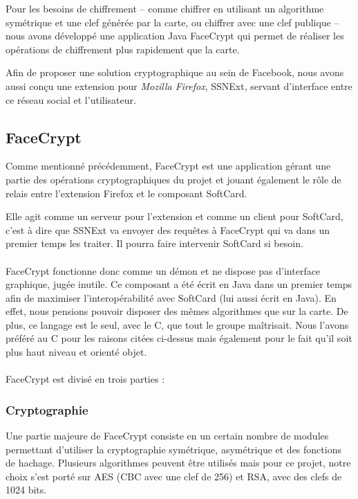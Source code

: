 \documentclass[a4paper,11pt,french]{article}
\begin{document}
Pour les besoins de chiffrement -- comme chiffrer en utilisant un algorithme
symétrique et une clef générée par la carte, ou chiffrer avec une clef
publique -- nous avons développé une application Java \og{}FaceCrypt \fg{}
qui permet de réaliser les opérations de chiffrement plus rapidement que la
carte.

Afin de proposer une solution cryptographique au sein de Facebook, nous avons 
aussi conçu une extension pour \emph{Mozilla Firefox}, SSNExt, servant 
d'interface entre ce réseau social et l'utilisateur.

\subsection{FaceCrypt}
Comme mentionné précédemment, FaceCrypt est une application gérant une partie
des opérations cryptographiques du projet et jouant également le rôle de
relais entre l'extension Firefox et le composant SoftCard. 

Elle agit comme un serveur pour l'extension et comme un client pour SoftCard, 
c'est à dire que SSNExt va envoyer des requêtes à FaceCrypt qui va dans un 
premier temps les traiter. Il pourra faire intervenir SoftCard si besoin.

\paragraph{}
FaceCrypt fonctionne donc comme un démon et ne dispose pas d'interface
graphique, jugée inutile. Ce composant a été écrit en Java dans un premier 
temps afin de maximiser l'interopérabilité avec SoftCard (lui aussi écrit en 
Java). En effet, nous pensions pouvoir disposer des mêmes algorithmes 
que sur la carte. De plus, ce langage est le seul, avec le C, que tout le
groupe maîtrisait. Nous l'avons préféré au C pour les raisons citées ci-dessus
mais également pour le fait qu'il soit plus haut niveau et orienté objet.

\paragraph{}
FaceCrypt est divisé en trois parties : 

\subsubsection{Cryptographie}
Une partie majeure de FaceCrypt consiste en un certain nombre de modules 
permettant d'utiliser la cryptographie symétrique, asymétrique et des 
fonctions de hachage. Plusieurs algorithmes peuvent être utilisés mais
pour ce projet, notre choix s'est porté sur AES (CBC avec une clef de 256) et 
RSA, avec des clefs de 1024 bits.
\end{document}
